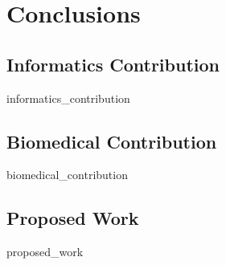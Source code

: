 \chapter{Conclusions}

\section{Informatics Contribution}
{informatics_contribution}
\clearpage

\section{Biomedical Contribution}
{biomedical_contribution}
\clearpage

\section{Proposed Work}
{proposed_work}
